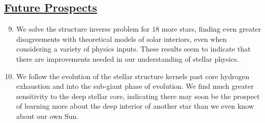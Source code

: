 \subsection*{\hspace*{0.5cm}\hyperref[chap:prospective]{Future Prospects}}
\begin{enumerate}
    \setcounter{enumi}{8}
    \item We solve the structure inverse problem for $18$ more stars, finding even greater disagreements with theoretical models of solar interiors, even when considering a variety of physics inputs. 
    These results seem to indicate that there are improvements needed in our understanding of stellar physics. 
    \item We follow the evolution of the stellar structure kernels past core hydrogen exhaustion and into the sub-giant phase of evolution. 
    We find much greater sensitivity to the deep stellar core, indicating there may soon be the prospect of learning more about the deep interior of another star than we even know about our own Sun. 
\end{enumerate}
